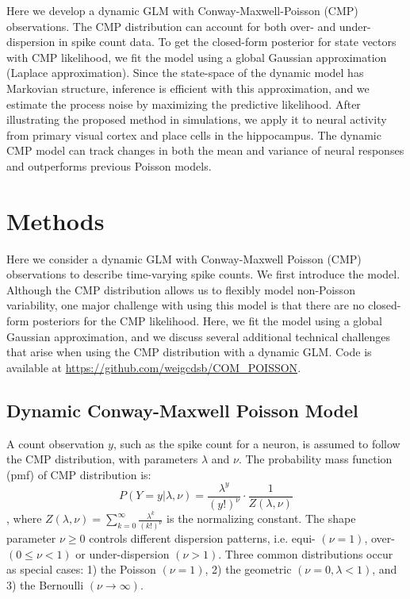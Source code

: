 \documentclass[aoas]{imsart}
\theoremstyle{plain}
\theoremstyle{remark}
\begin{document}
Here we develop a dynamic GLM with Conway-Maxwell-Poisson (CMP) observations. The CMP distribution can account for both over- and under-dispersion in spike count data. To get the closed-form posterior for state vectors with CMP likelihood, we fit the model using a global Gaussian approximation (Laplace approximation). Since the state-space of the dynamic model has Markovian structure, inference is efficient with this approximation, and we estimate the process noise by maximizing the predictive likelihood. After illustrating the proposed method in simulations, we apply it to neural activity from primary visual cortex and place cells in the hippocampus. The dynamic CMP model can track changes in both the mean and variance of neural responses and outperforms previous Poisson models.

\section{Methods}
Here we consider a dynamic GLM with Conway-Maxwell Poisson (CMP) observations to describe time-varying spike counts. We first introduce the model. Although the CMP distribution allows us to flexibly model non-Poisson variability, one major challenge with using this model is that there are no closed-form posteriors for the CMP likelihood. Here, we fit the model using a global Gaussian approximation, and we discuss several additional technical challenges that arise when using the CMP distribution with a dynamic GLM. Code is available at \url{https://github.com/weigcdsb/COM_POISSON}. 

\subsection{Dynamic Conway-Maxwell Poisson Model}
A count observation $y$, such as the spike count for a neuron, is assumed to follow the CMP distribution, with parameters $\lambda$ and $\nu$. The probability mass function (pmf) of CMP distribution is:
\begin{equation}
	P(Y=y|\lambda, \nu) = \frac{\lambda^y}{(y!)^\nu}\cdot\frac{1}{Z(\lambda, \nu)}
\end{equation}
, where $Z(\lambda, \nu)=\sum_{k=0}^{\infty}\frac{\lambda^k}{(k!)^\nu}$ is the normalizing constant. The shape parameter $\nu \geq 0$ controls different dispersion patterns, i.e. equi- $(\nu=1)$, over- $(0\leq\nu<1)$ or under-dispersion $(\nu > 1)$. Three common distributions occur as special cases: 1) the Poisson $(\nu=1)$, 2) the geometric $(\nu=0, \lambda<1)$, and 3) the Bernoulli $(\nu \rightarrow \infty)$.
\end{document}

